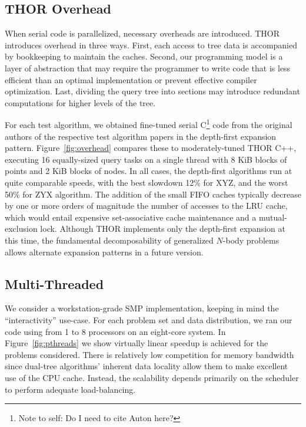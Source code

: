 \documentclass[twoside,leqno,twocolumn]{article}
\newcommand{\authornote}[1]{\footnote{Note to self: #1}}
\newcommand{\authorsnote}[1]{\authornote{#1}}
\newcommand{\fig}[1]{Figure~\ref{fig:#1}}
\begin{document}
\subsection{THOR Overhead}

When serial code is parallelized, necessary overheads are introduced.
THOR introduces overhead in three ways.
First, each access to tree data is accompanied by bookkeeping to maintain the caches.
Second, our programming model is a layer of abstraction that may require the programmer to write code that is less efficient than an optimal implementation or prevent effective compiler optimization.
Last, dividing the query tree into sections may introduce redundant computations for higher levels of the tree.

For each test algorithm, we obtained fine-tuned serial C\authorsnote{Do I need to cite Auton here?} code from the original authors of the respective test algorithm papers \cite{various, algorithms, WALDO} in the depth-first expansion pattern.
\fig{overhead} compares these to moderately-tuned THOR C++, executing 16 equally-sized query tasks on a single thread with 8 KiB blocks of points and 2 KiB blocks of nodes.
In all cases, the depth-first algorithms run at quite comparable speeds, with the best slowdown 12\% for XYZ, and the worst 50\% for ZYX algorithm.
The addition of the small FIFO caches typically decrease by one or more orders of magnitude the number of accesses to the LRU cache, which would entail expensive set-associative cache maintenance and a mutual-exclusion lock.
Although THOR implements only the depth-first expansion at this time, the fundamental decomposability of generalized $N$-body problems allows alternate expansion patterns in a future version.

\subsection{Multi-Threaded}

We consider a workstation-grade SMP implementation, keeping in mind the ``interactivity'' use-case.
For each problem set and data distribution, we ran our code using from 1 to 8 processors on an eight-core system.
In \fig{pthreads} we show virtually linear speedup is achieved for the problems considered.
There is relatively low competition for memory bandwidth since dual-tree algorithms' inherent data locality allow them to make excellent use of the CPU cache.
Instead, the scalability depends primarily on the scheduler to perform adequate load-balancing.
\end{document}
